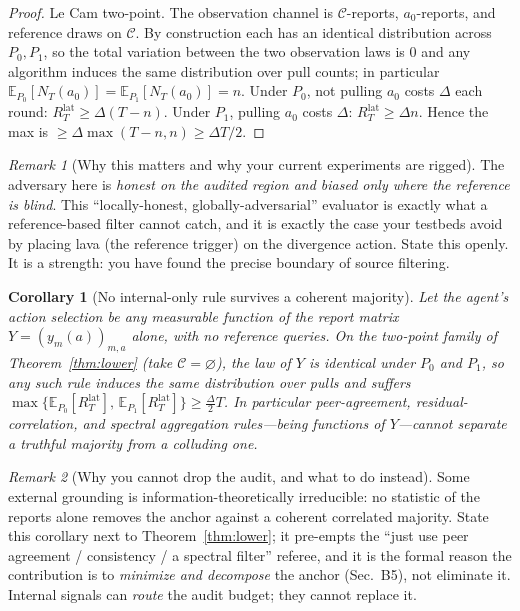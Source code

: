 \documentclass[11pt]{article}
\newtheorem{corollary}{Corollary}
\theoremstyle{definition}
\theoremstyle{remark}
\newtheorem{remark}{Remark}
\newcommand{\Cov}{\mathcal{C}}
\newcommand{\E}{\mathbb{E}}
\begin{document}
\begin{proof}[Proof]
Le Cam two-point. The observation channel is $\Cov$-reports, $a_0$-reports, and reference draws
on $\Cov$. By construction each has an identical distribution across $P_0,P_1$, so the total
variation between the two observation laws is $0$ and any algorithm induces the same distribution
over pull counts; in particular $\E_{P_0}[N_T(a_0)]=\E_{P_1}[N_T(a_0)]=n$. Under $P_0$, not pulling
$a_0$ costs $\Delta$ each round: $R^{\mathrm{lat}}_T\ge \Delta(T-n)$. Under $P_1$, pulling $a_0$
costs $\Delta$: $R^{\mathrm{lat}}_T\ge \Delta n$. Hence the max is $\ge \Delta\max(T-n,n)\ge \Delta T/2$.
\end{proof}

\begin{remark}[Why this matters and why your current experiments are rigged]
The adversary here is \emph{honest on the audited region and biased only where the reference is
blind}. This ``locally-honest, globally-adversarial'' evaluator is exactly what a reference-based
filter cannot catch, and it is exactly the case your testbeds avoid by placing lava (the reference
trigger) on the divergence action. State this openly. It is a strength: you have found the precise
boundary of source filtering.
\end{remark}

\begin{corollary}[No internal-only rule survives a coherent majority]
\label{cor:internal}
Let the agent's action selection be any measurable function of the report matrix
$Y=(y_m(a))_{m,a}$ alone, with no reference queries. On the two-point family of
Theorem~\ref{thm:lower} (take $\Cov=\varnothing$), the law of $Y$ is identical under $P_0$ and
$P_1$, so any such rule induces the same distribution over pulls and suffers
$\max\{\E_{P_0}[R^{\mathrm{lat}}_T],\,\E_{P_1}[R^{\mathrm{lat}}_T]\}\ge \tfrac{\Delta}{2}T$.
In particular peer-agreement, residual-correlation, and spectral aggregation rules---being
functions of $Y$---cannot separate a truthful majority from a colluding one.
\end{corollary}

\begin{remark}[Why you cannot drop the audit, and what to do instead]
Some external grounding is information-theoretically irreducible: no statistic of the reports
alone removes the anchor against a coherent correlated majority. State this corollary next to
Theorem~\ref{thm:lower}; it pre-empts the ``just use peer agreement / consistency / a spectral
filter'' referee, and it is the formal reason the contribution is to \emph{minimize and decompose}
the anchor (Sec.~B5), not eliminate it. Internal signals can \emph{route} the audit budget; they
cannot replace it.
\end{remark}
\end{document}
